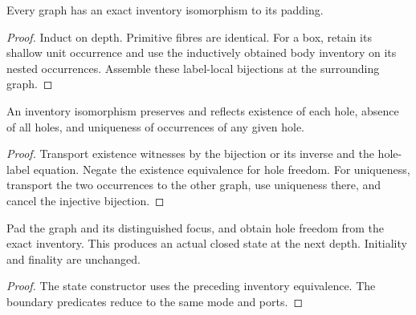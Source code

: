 



\begin{lemma}
Every graph has an exact inventory isomorphism to its padding.
\end{lemma}

\begin{proof}
Induct on depth. Primitive fibres are identical. For a box, retain its shallow unit occurrence and use the inductively obtained body inventory on its nested occurrences. Assemble these label-local bijections at the surrounding graph.
\end{proof}



\begin{lemma}
An inventory isomorphism preserves and reflects existence of each hole, absence of all holes, and uniqueness of occurrences of any given hole.
\end{lemma}

\begin{proof}
Transport existence witnesses by the bijection or its inverse and the hole-label equation. Negate the existence equivalence for hole freedom. For uniqueness, transport the two occurrences to the other graph, use uniqueness there, and cancel the injective bijection.
\end{proof}





\begin{lemma}
Pad the graph and its distinguished focus, and obtain hole freedom from the exact inventory. This produces an actual closed state at the next depth. Initiality and finality are unchanged.
\end{lemma}

\begin{proof}
The state constructor uses the preceding inventory equivalence. The boundary predicates reduce to the same mode and ports.
\end{proof}

